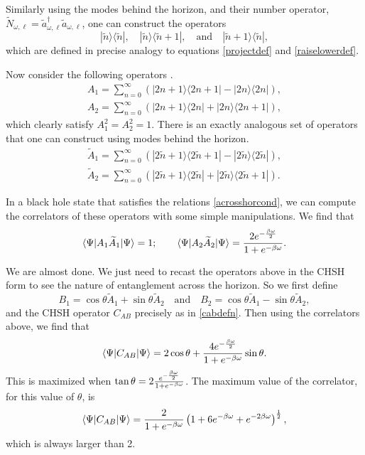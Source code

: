 \documentclass[12pt]{article}
\def\schwarzn{N}
\newcommand{\cop}[1]{#1}
\def\ta{\widetilde{\cop{a}}}
\newcommand{\be}{\begin{equation}}
\newcommand{\ee}{\end{equation}}
\begin{document}
Similarly using the modes behind the horizon, and their number operator, $\widetilde{\schwarzn}_{\omega, \ell} = \ta_{\omega, \ell}^{\dagger} \ta_{\omega, \ell}$, one can construct the operators 
\[
|\widetilde{n} \rangle \langle \widetilde{n} |, \quad  |\widetilde{n} \rangle \langle \widetilde{n}+1|, \quad \text{and} \quad |\widetilde{n} + 1\rangle \langle \widetilde{n}|,
\]
which are defined in precise analogy to equations \eqref{projectdef} and \eqref{raiselowerdef}.

Now consider the following operators \cite{chen2002maximal}.
\be
\label{a1a2def}
\begin{split}
A_1 = \sum_{n=0}^{\infty} \left( |2 n + 1 \rangle \langle 2 n + 1| - |2 n \rangle \langle 2 n| \right), \\
A_2 = \sum_{n=0}^{\infty} \left( |2 n + 1 \rangle \langle 2 n| +  |2 n \rangle \langle 2 n + 1| \right),
\end{split}
\ee
which clearly satisfy $A_1^2 = A_2^2 = 1$.
There is an exactly analogous set of operators that one can construct using modes behind the horizon. 
\be
\begin{split}
\widetilde{A}_1 = \sum_{n=0}^{\infty} \left(|2 \widetilde{n} + 1 \rangle \langle 2 \widetilde{n} + 1| - |2 \widetilde{n} \rangle \langle 2 \widetilde{n}| \right), \\
\widetilde{A}_2 = \sum_{n=0}^{\infty} \left(|2 \widetilde{n} + 1 \rangle \langle 2 \widetilde{n}| +  |2 \widetilde{n} \rangle \langle 2 \widetilde{n} + 1| \right).
\end{split}
\ee

In a black hole state that satisfies the relations \eqref{acrosshorcond}, we can compute the correlators of these operators with some simple manipulations. We find that
\be
\langle \Psi | A_1 \widetilde{A}_1 | \Psi \rangle = 1; \qquad \langle \Psi | A_2 \widetilde{A}_2 | \Psi \rangle = {2 e^{-{\beta \omega \over 2}} \over 1 + e^{-\beta \omega}}.
\ee


We are almost done. We just need to recast the operators above in the CHSH form to see the nature of entanglement across the horizon. So we first define
\be
B_1 = \cos \theta \widetilde{A}_1 + \sin \theta \widetilde{A}_2  \quad \text{and}  \quad B_2 = \cos \theta \widetilde{A}_1 - \sin \theta \widetilde{A}_2,
\ee
and the CHSH operator $C_{AB}$ precisely as in \eqref{cabdefn}. Then using the correlators above, we find that
\be
\langle \Psi | C_{AB} |\Psi \rangle =  2 \cos \theta + {4 e^{-{\beta \omega \over 2}} \over 1 + e^{-{\beta \omega}}}\sin \theta .
\ee
This is maximized when $\tan \theta  = 2 {e^{-{\beta \omega \over 2}} \over 1 + e^{-{\beta \omega}}}$. The maximum value of the correlator, for this value of $\theta$,  is
\be
\label{maxentacross}
\langle \Psi | C_{AB} |\Psi  \rangle = {2 \over 1 + e^{-\beta \omega}} \left(1 + 6 e^{-{\beta \omega}} + e^{-2{\beta \omega}} \right)^{1 \over 2},
\ee
which is always larger than 2.
\end{document}

